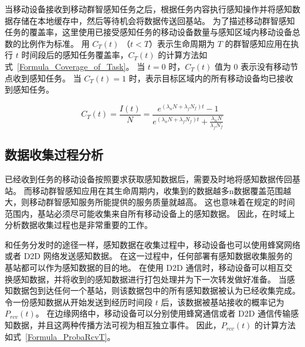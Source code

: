 当移动设备接收到移动群智感知任务之后，根据任务内容执行感知操作并将感知数据存储在本地缓存中，然后等待机会将数据传送回基站。
为了描述移动群智感知任务的覆盖率，这里使用已接受感知任务的移动设备数量与感知区域内移动设备总数的比例作为标准。
用 $C_T(t)$ （$t < T$）表示生命周期为 $T$ 的群智感知应用在执行 $t$ 时间段后的感知任务覆盖率，$C_T(t)$ 的计算方法如式~\eqref{Formula_Coverage_of_Task}。
当 $t=0$ 时，$C_T(t)$ 值为 0 表示没有移动节点收到感知任务。
当 $C_T(t) = 1$ 时，表示目标区域内的所有移动设备均已接收到感知任务。

\begin{equation}
  \label{Formula_Coverage_of_Task}
  C_T(t) = \frac{I(t)}{N} = \frac{e^{(\lambda_n N + \lambda_f N_f) t} - 1}{e^{(\lambda_n N + \lambda_f N_f) t} + \frac{\lambda_n N}{\lambda_f N_f}}
\end{equation}

\subsection{数据收集过程分析}


已经收到任务的移动设备按照要求获取感知数据后，需要及时地将感知数据传回基站。
而移动群智感知应用在其生命周期内，收集到的数据越多n数据覆盖范围越大，则移动群智感知服务所能提供的服务质量就越高。
这也意味着在规定的时间范围内，基站必须尽可能收集来自所有移动设备上的感知数据。
因此，在时域上分析数据收集过程也是非常重要的工作。

和任务分发时的途径一样，感知数据在收集过程中，移动设备也可以使用蜂窝网络或者 D2D 网络发送感知数据。
在这一过程中，任何部署有感知数据收集服务的基站都可以作为感知数据的目的地。
在使用 D2D 通信时，移动设备可以相互交换感知数据，并将收到的感知数据进行打包处理并为下一次转发做好准备。
当感知数据包到达任何一个基站，则该数据包中的所有感知数据被认为已经收集完成。
令一份感知数据从开始发送到经历时间段 $t$ 后，该数据被基站接收的概率记为 $P_{rcv}(t)$。
在边缘网络中，移动设备可以分别使用蜂窝通信或者 D2D 通信传输感知数据，并且这两种传播方法可视为相互独立事件。
因此，$P_{rcv}(t)$ 的计算方法如式~\eqref{Formula_ProbaRcvT}。

